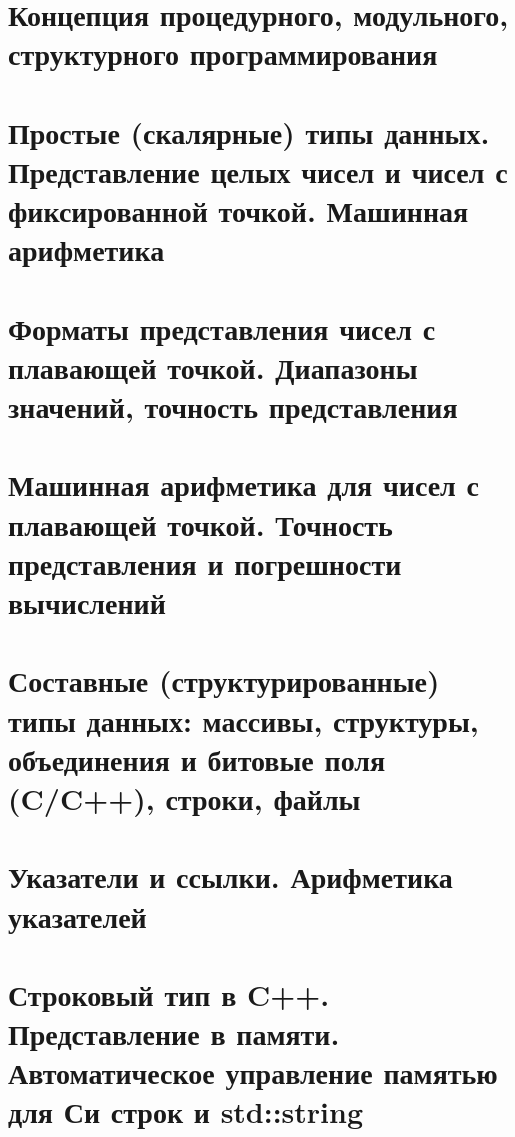 \section{Концепция процедурного, модульного, структурного программирования}
\section{Простые (скалярные) типы данных. Представление целых чисел и чисел с фиксированной точкой. Машинная арифметика}
\section{Форматы представления чисел с плавающей точкой. Диапазоны значений, точность представления}
\section{Машинная арифметика для чисел с плавающей точкой. Точность представления и погрешности вычислений}
\section{Составные (структурированные) типы данных: массивы, структуры, объединения и битовые поля (C/C++), строки, файлы}
\section{Указатели и ссылки. Арифметика указателей}
\section{Строковый тип в C++. Представление в памяти. Автоматическое управление памятью для Си строк и std::string}
